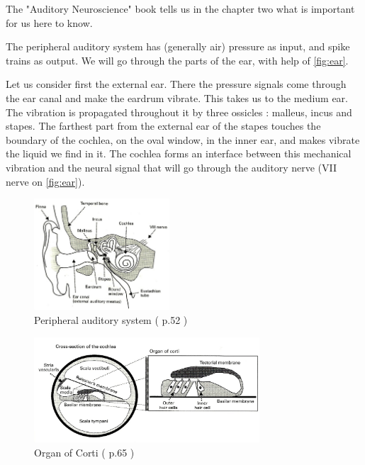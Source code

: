 The "Auditory Neuroscience" book \cite{AuditoryNeuroscience} tells us in the 
chapter two what is important for us here to know. 

The peripheral auditory system has (generally air) pressure as input, 
and spike trains as output. We will go through the parts of the ear, with help 
of \autoref{fig:ear}. 

Let us consider first the external ear. There the pressure signals come through
 the ear canal and make the eardrum vibrate. 
This takes us to the medium ear. 
The vibration is propagated throughout it by three ossicles : malleus, incus 
and stapes. The farthest part from the external ear of the stapes touches the 
boundary of the cochlea, on the oval window, in the inner ear, 
and makes vibrate the liquid we find in it. 
The cochlea forms an interface between this mechanical vibration 
and the neural signal that will go through the auditory nerve 
(VII nerve on \autoref{fig:ear}).


\begin{figure}[h]
	\centering
	\includegraphics[width=0.45\textwidth]{images/ear2-aud52-level.jpg}
	\caption{Peripheral auditory system (\cite{AuditoryNeuroscience} p.52 )}
	\label{fig:ear}
\end{figure}

\begin{figure}[ht]
	\centering
  \includegraphics[width=0.75\textwidth]{images/corti2-aud65-level.jpg}
	\caption{Organ of Corti (\cite{AuditoryNeuroscience} p.65 )}
	\label{fig:corti}
\end{figure}

